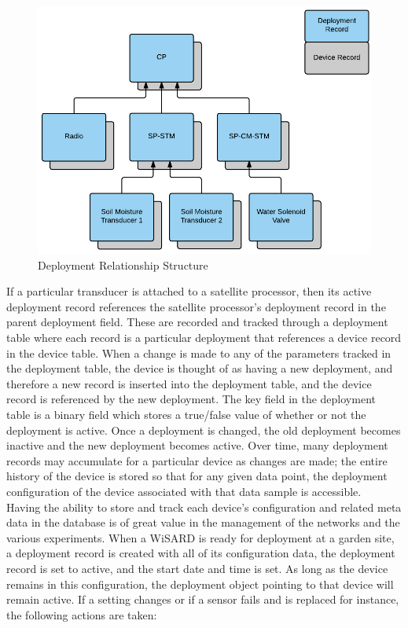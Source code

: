 \begin{figure}[htbp]
	\centering
	\includegraphics[width=\textwidth]{figures/deployment_hierarchy_edit.png}
	\caption{Deployment Relationship Structure}
	\label{fig:deployment_hierarchy_edit}
\end{figure}

If a particular transducer is attached to a satellite processor, then its active deployment record references the satellite processor's deployment record in the parent deployment field. These are recorded and tracked through a deployment table where each record is a particular deployment that references a device record in the device table. When a change is made to any of the parameters tracked in the deployment table, the device is thought of as having a new deployment, and therefore a new record is inserted into the deployment table, and the device record is referenced by the new deployment. The key field in the deployment table is a binary field which stores a true/false value of whether or not the deployment is active. Once a deployment is changed, the old deployment becomes inactive and the new deployment becomes active. Over time, many deployment records may accumulate for a particular device as changes are made; the entire history of the device is stored so that for any given data point, the deployment configuration of the device associated with that data sample is accessible.\\

Having the ability to store and track each device's configuration and related meta data in the database is of great value in the management of the networks and the various experiments. When a WiSARD is ready for deployment at a garden site, a deployment record is created with all of its configuration data, the deployment record is set to active, and the start date and time is set. As long as the device remains in this configuration, the deployment object pointing to that device will remain active. If a setting changes or if a sensor fails and is replaced for instance, the following actions are taken:

